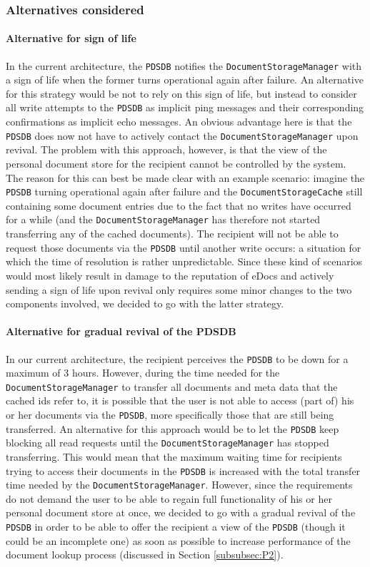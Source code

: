 \documentclass[a4paper,10pt]{article}
\begin{document}
\subsubsection*{Alternatives considered}
\paragraph{Alternative for sign of life}
In the current architecture, the \texttt{PDSDB} notifies the \texttt{DocumentStorageManager} with a sign of life when the former turns operational again after failure. An alternative for this strategy would be not to rely on this sign of life, but instead to consider all write attempts to the \texttt{PDSDB} as implicit ping messages and their corresponding confirmations as implicit echo messages. An obvious advantage here is that the \texttt{PDSDB} does now not have to actively contact the \texttt{DocumentStorageManager} upon revival. The problem with this approach, however, is that the view of the personal document store for the recipient cannot be controlled by the system. The reason for this can best be made clear with an example scenario: imagine the \texttt{PDSDB} turning operational again after failure and the \texttt{DocumentStorageCache} still containing some document entries due to the fact that no writes have occurred for a while (and the \texttt{DocumentStorageManager} has therefore not started transferring any of the cached documents). The recipient will not be able to request those documents via the \texttt{PDSDB} until another write occurs: a situation for which the time of resolution is rather unpredictable. Since these kind of scenarios would most likely result in damage to the reputation of eDocs and actively sending a sign of life upon revival only requires some minor changes to the two components involved, we decided to go with the latter strategy.
\paragraph{Alternative for gradual revival of the PDSDB}
In our current architecture, the recipient perceives the \texttt{PDSDB} to be down for a maximum of 3 hours. However, during the time needed for the \texttt{DocumentStorageManager} to transfer all documents and meta data that the cached ids refer to, it is possible that the user is not able to access (part of) his or her documents via the \texttt{PDSDB}, more specifically those that are still being transferred. An alternative for this approach would be to let the \texttt{PDSDB} keep blocking all read requests until the \texttt{DocumentStorageManager} has stopped transferring. This would mean that the maximum waiting time for recipients trying to access their documents in the \texttt{PDSDB} is increased with the total transfer time needed by the \texttt{DocumentStorageManager}. However, since the requirements do not demand the user to be able to regain full functionality of his or her personal document store at once, we decided to go with a gradual revival of the \texttt{PDSDB} in order to be able to offer the recipient a view of the \texttt{PDSDB} (though it could be an incomplete one) as soon as possible to increase performance of the document lookup process (discussed in Section \ref{subsubsec:P2}).
\end{document}
